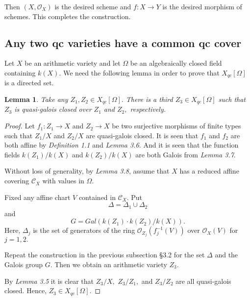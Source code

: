 \documentclass[12pt,twoside,reqno]{amsart}
\newtheorem{lemma}[theorem]{Lemma}
\theoremstyle{definition}
\numberwithin{equation}{section}
\begin{document}
Then $\left( X,\mathcal{O}_{X}\right) $ is the desired scheme and $f:X\rightarrow Y$ is the desired morphism of schemes. This completes the
construction.

\subsection{Any two qc varieties have a common qc cover}

Let $X$ be an arithmetic variety and let $\Omega $ be an algebraically
closed field containing $k\left( X\right) .$ We need the following lemma in
order to prove that $X_{qc}\left[ \Omega \right] $ is a directed set.

\begin{lemma}
Take any $Z_{1},Z_{2}\in X_{qc}\left[ \Omega \right] .$ There is a third $Z_{3}\in X_{qc}\left[ \Omega \right] $ such that $Z_{3}$ is quasi-galois
closed over $Z_{1}$ and $Z_{2},$ respectively.
\end{lemma}

\begin{proof}
Let $f_{1}:Z_{1}\rightarrow X$ and $Z_{2}\rightarrow X$ be two surjective
morphisms of finite types such that $Z_{1}/X$ and $Z_{2}/X$ are quasi-galois
closed. It is seen that $f_{1}$ and $f_{2}$ are both affine by \emph{Definition 1.1} and \emph{Lemma 3.6.} And it is seen that the function
fields $k\left( Z_{1}\right) /k\left( X\right) $ and $k\left( Z_{2}\right)
/k\left( X\right) $ are both Galois from \emph{Lemma 3.7}.

Without loss of
generality, by \emph{Lemma 3.8}, assume that $X$ has a reduced affine
covering $\mathcal{C}_{X}$ with values in $\Omega .$

Fixed any affine chart $V$ contained in $\mathcal{C}_{X}.$ Put $$\Delta
=\Delta _{1}\cup \Delta _{2}$$ and $$G=Gal\left( k\left( Z_{1}\right) \cdot
k\left( Z_{2}\right) /k\left( X\right) \right) .$$ Here, $\Delta _{j}$ is the
set of generators of the ring $\mathcal{O}_{Z_{j}}\left( f_{j}^{-1}\left(
V\right) \right) $ over $\mathcal{O}_{X}\left( V\right) $ for $j=1,2.$

Repeat the construction in the previous subsection \S 3.2 for the set $\Delta $ and the Galois group $G.$ Then we obtain an arithmetic variety $Z_{3}$.

By \emph{Lemma 3.5} it is clear that $Z_{3}/X,$ $Z_{3}/Z_{1},$ and $Z_{3}/Z_{2}$ are all quasi-galois closed. Hence, $Z_{3}\in X_{qc}\left[
\Omega \right] .$
\end{proof}
\end{document}
